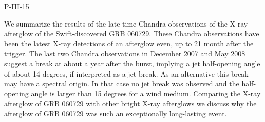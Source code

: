 P-III-15


\bigskip



\bigskip

\noindent We summarize the results of the late-time Chandra observations of the X-ray afterglow of the Swift-discovered GRB 060729. These Chandra observations have been the latest X-ray detections of an afterglow even, up to 21 month after the trigger. The last two Chandra observations in December 2007 and May 2008 suggest a break at about a year after the burst, implying a jet half-opening angle of about 14 degrees, if interpreted as a jet break. As an alternative this break may have a spectral origin. In that case no jet break was observed and the half-opening angle is larger than 15 degrees for a wind medium. Comparing the X-ray afterglow of GRB 060729 with other bright X-ray afterglows we discuss why the afterglow of GRB 060729 was such an exceptionally long-lasting event.
